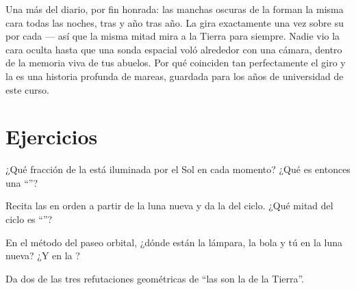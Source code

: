 \begin{remark}\label{rem:g7:moon-phases:sameface}
Una  más del diario, por fin honrada: las manchas oscuras
de la  forman la misma cara todas las noches,  tras
 y año tras año. La  gira exactamente una vez sobre su
 por cada  --- así que la misma mitad mira a la Tierra
para siempre. Nadie vio la cara oculta hasta que una sonda espacial
voló alrededor con una cámara, dentro de la memoria viva de tus
abuelos. Por qué coinciden tan perfectamente el giro y la  es
una historia profunda de mareas, guardada para los años de
universidad de este curso.
\end{remark}

\section{Ejercicios}

\begin{exercise}[$\star$]\label{exo:g7:moon-phases:1}
¿Qué fracción de la  está iluminada por el Sol en cada momento?
¿Qué es entonces una ``''?
\end{exercise}

\begin{exercise}[$\star$]\label{exo:g7:moon-phases:2}
Recita las  en orden a partir de la luna nueva y da la
 del ciclo. ¿Qué mitad del ciclo es ``''?
\end{exercise}

\begin{exercise}[$\star$]\label{exo:g7:moon-phases:3}
En el método del paseo orbital, ¿dónde están la lámpara, la bola y tú
en la luna nueva? ¿Y en la ?
\end{exercise}

\begin{exercise}[$\star$]\label{exo:g7:moon-phases:4}
Da dos de las tres refutaciones geométricas de ``las  son la
 de la Tierra''.
\end{exercise}

